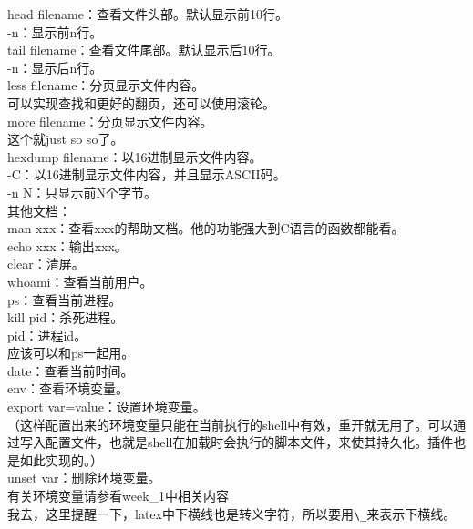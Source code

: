 \documentclass{article}
\begin{document}
\noindent
head filename：查看文件头部。默认显示前10行。\\
\hspace*{2em} -n：显示前n行。\\

\noindent
tail filename：查看文件尾部。默认显示后10行。\\
\hspace*{2em} -n：显示后n行。\\

\noindent
less filename：分页显示文件内容。\\
\hspace*{2em} 可以实现查找和更好的翻页，还可以使用滚轮。\\

\noindent
more filename：分页显示文件内容。\\
\hspace*{2em} 这个就just so so了。\\

\noindent
hexdump filename：以16进制显示文件内容。\\
\hspace*{2em} -C：以16进制显示文件内容，并且显示ASCII码。\\
\hspace*{2em} -n N：只显示前N个字节。\\

\noindent
其他文档：\\
man xxx：查看xxx的帮助文档。他的功能强大到C语言的函数都能看。\\
echo xxx：输出xxx。\\

\noindent
clear：清屏。\\
whoami：查看当前用户。\\
ps：查看当前进程。\\
kill pid：杀死进程。\\
\hspace*{2em} pid：进程id。\\
\hspace*{2em} 应该可以和ps一起用。\\
date：查看当前时间。\\
env：查看环境变量。\\
export var=value：设置环境变量。\\
（这样配置出来的环境变量只能在当前执行的shell中有效，重开就无用了。可以通过写入配置文件，也就是shell在加载时会执行的脚本文件，来使其持久化。插件也是如此实现的。）\\
unset var：删除环境变量。\\
\hspace*{2em} 有关环境变量请参看week\_1中相关内容\\
\hspace*{2em} 我去，这里提醒一下，latex中下横线也是转义字符，所以要用\verb|\_|来表示下横线。\\
\end{document}
